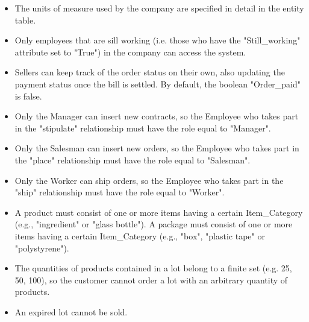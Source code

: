 \begin{itemize}
\item The units of measure used by the company are specified in detail in the entity table.
\item Only employees that are sill working (i.e. those who have the "Still\_working" attribute set to "True") in the company can access the system.
\item Sellers can keep track of the order status on their own, also updating the payment status once the bill is settled. By default, the boolean "Order\_paid" is false. 
\item Only the Manager can insert new contracts, so the Employee who takes part in the "stipulate" relationship must have the role equal to "Manager". 
\item Only the Salesman can insert new orders, so the Employee who takes part in the "place" relationship must have the role equal to "Salesman". 
\item Only the Worker can ship orders, so the Employee who takes part in the "ship" relationship must have the role equal to "Worker".
\item A product must consist of one or more items having a certain Item\_Category (e.g., "ingredient" or "glass bottle"). A package must consist of one or more items having a certain Item\_Category (e.g., "box", "plastic tape" or "polystyrene"). 
\item The quantities of products contained in a lot belong to a finite set (e.g. 25, 50, 100), so the customer cannot order a lot with an arbitrary quantity of products.
\item An expired lot cannot be sold.
\end{itemize}
